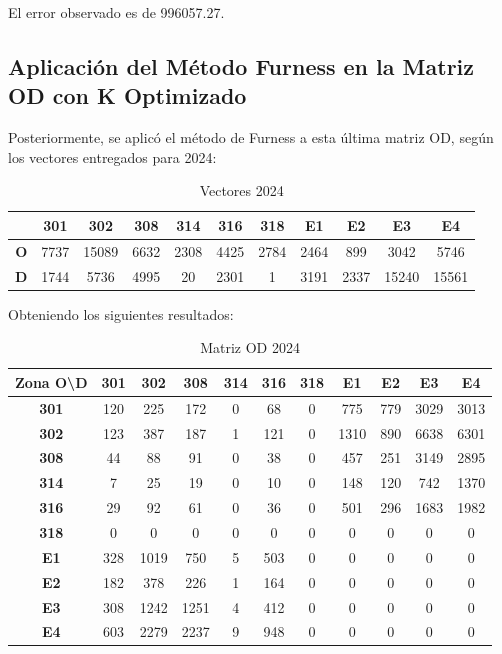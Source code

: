 \documentclass[12pt]{article} %
\begin{document}
El error observado es de 996057.27.

\subsection{Aplicación del Método Furness en la Matriz OD con K Optimizado}

Posteriormente, se aplicó el método de Furness a esta última matriz OD, según los vectores entregados para 2024:

\begin{table}[H]
  \centering
  \footnotesize
  \begin{tabular}{c|cccccccccc}    
  \textbf{} & \textbf{301} & \textbf{302} & \textbf{308} & \textbf{314} & \textbf{316} & \textbf{318} & \textbf{E1} & \textbf{E2} & \textbf{E3} & \textbf{E4} \\ \hline
  \textbf{O} & 7737 & 15089 & 6632 & 2308 & 4425 & 2784 & 2464 & 899 & 3042 & 5746 \\ 
  \textbf{D} & 1744 & 5736 & 4995 & 20 & 2301 & 1 & 3191 & 2337 & 15240 & 15561 \\ 
  \end{tabular}
  \caption{Vectores 2024}
  \label{table:V_2024}
\end{table}

Obteniendo los siguientes resultados:

\begin{table}[H]
  \centering
  \footnotesize
  \begin{tabular}{c|cccccccccc}    
  \textbf{Zona O\textbackslash D} & \textbf{301} & \textbf{302} & \textbf{308} & \textbf{314} & \textbf{316} & \textbf{318} & \textbf{E1} & \textbf{E2} & \textbf{E3} & \textbf{E4} \\ \hline
  \textbf{301} & 120 & 225 & 172 & 0 & 68 & 0 & 775 & 779 & 3029 & 3013 \\ 
  \textbf{302} & 123 & 387 & 187 & 1 & 121 & 0 & 1310 & 890 & 6638 & 6301 \\ 
  \textbf{308} & 44 & 88 & 91 & 0 & 38 & 0 & 457 & 251 & 3149 & 2895 \\ 
  \textbf{314} & 7 & 25 & 19 & 0 & 10 & 0 & 148 & 120 & 742 & 1370 \\ 
  \textbf{316} & 29 & 92 & 61 & 0 & 36 & 0 & 501 & 296 & 1683 & 1982 \\ 
  \textbf{318} & 0 & 0 & 0 & 0 & 0 & 0 & 0 & 0 & 0 & 0 \\ 
  \textbf{E1} & 328 & 1019 & 750 & 5 & 503 & 0 & 0 & 0 & 0 & 0 \\ 
  \textbf{E2} & 182 & 378 & 226 & 1 & 164 & 0 & 0 & 0 & 0 & 0 \\ 
  \textbf{E3} & 308 & 1242 & 1251 & 4 & 412 & 0 & 0 & 0 & 0 & 0 \\ 
  \textbf{E4} & 603 & 2279 & 2237 & 9 & 948 & 0 & 0 & 0 & 0 & 0 \\ 
  \end{tabular}
  \caption{Matriz OD 2024}
  \label{table:M_2024}
\end{table}
\end{document}
